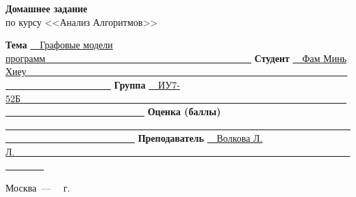 \begin{titlepage}
\begin{center}
	\textbf{\large Домашнее задание} \\
	\large
	по курсу <<Анализ Алгоритмов>>
\end{center}

	
	\noindent\textbf{Тема} \underline{~~Графовые модели программ~~~~~~~~~~~~~~~~~~~~~~~~~~~~~~~~~~~~~~~~~~~}\newline\newline
	\noindent\textbf{Студент} \underline{~~Фам Минь Хиеу~~~~~~~~~~~~~~~~~~~~~~~~~~~~~~~~~~~~~~~~~~~~~~~~~~~~~~~~~~~~~~~~~~~~~~~~~~~~~~~~~~~~~~~~~}\newline\newline
	\noindent\textbf{Группа} \underline{~~ИУ7-52Б~~~~~~~~~~~~~~~~~~~~~~~~~~~~~~~~~~~~~~~~~~~~~~~~~~~~~~~~~~~~~~~~~~~~~~~~~~~~~~~~~~~~~~~~~~~~~~~~~}\newline\newline
	\noindent\textbf{Оценка (баллы)} \underline{~~~~~~~~~~~~~~~~~~~~~~~~~~~~~~~~~~~~~~~~~~~~~~~~~~~~~~~~~~~~~~~~~~~~~~~~~~~~~~~~~~~~~~~~~~~~~~~~~~~}\newline\newline
	\noindent\textbf{Преподаватель} \underline{~~Волкова Л. Л.~~~~~~~~~~~~~~~~~~~~~~~~~~~~~~~~~~~~~~~~~~~~~~~~~~~~~~~~~~~~~~~~~~~~~~~~~~~~~~}\newline
	
	\begin{center}
		\vfill
		Москва~---~\the\year
		~г.
	\end{center}
 
    \restoregeometry
    
\end{titlepage}